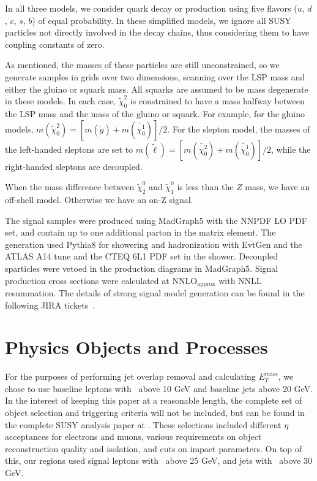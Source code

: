 In all three models, we consider quark decay or production using five flavors ($u$, $d$, $c$, $s$, $b$) of equal probability. In these simplified models, we ignore all SUSY particles not directly involved in the decay chains, thus considering them to have coupling constants of zero.

As mentioned, the masses of these particles are still unconstrained, so we generate samples in grids over two dimensions, scanning over the LSP mass and either the gluino or squark mass. All squarks are assumed to be mass degenerate in these models. In each case, $\tilde{\chi}_0^2$ is constrained to have a mass halfway between the LSP mass and the mass of the gluino or squark. For example, for the gluino models, $m(\tilde{\chi}_0^2) = [m(\tilde{g})+m(\tilde{\chi^1_0})]/2$. For the slepton model, the masses of the left-handed sleptons are set to $m(\tilde{\ell}) = [m(\tilde{\chi^2_0})+m(\tilde{\chi^1_0})]/2$, while the right-handed sleptons are decoupled.

When the mass difference between $\tilde{\chi}_{2}^{0}$ and $\tilde{\chi}_{1}^{0}$ is less than the $Z$ mass, we have an off-shell model. Otherwise we have an on-Z signal.

The signal samples were produced using MadGraph5 with the NNPDF LO PDF set, and contain up to one additional parton in the matrix element. The generation used Pythia8 for showering and hadronization with EvtGen and the ATLAS A14 tune and the CTEQ 6L1 PDF set in the shower. Decoupled sparticles were vetoed in the production diagrams in MadGraph5. Signal production cross sections were calculated at NNLO$_\text{approx}$ with NNLL resummation. The details of strong signal model generation can be found in the following JIRA tickets~\cite{JIRAGluinoSLN, JIRAGluinoZ, JIRASleptonZ}.

\section{Physics Objects and Processes}

For the purposes of performing jet overlap removal and calculating $E_T^{miss}$, we chose to use baseline leptons with \pt\ above 10 GeV and baseline jets above 20 GeV. In the interest of keeping this paper at a reasonable length, the complete set of object selection and triggering criteria will not be included, but can be found in the complete SUSY analysis paper at \cite{SUSY_2l2j}. These selections included different $\eta$ acceptances for electrons and muons, various requirements on object reconstruction quality and isolation, and cuts on impact parameters. On top of this, our regions used signal leptons with \pt\ above 25 GeV, and jets with \pt\ above 30 GeV.


